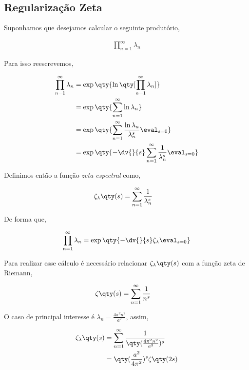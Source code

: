 \documentclass[twoside]{amsart}
\numberwithin{equation}{section}
\begin{document}
\appendix

\begin{refsection}
\section{Regularização Zeta}

Suponhamos que desejamos calcular o seguinte produtório,

\begin{align}
    \prod\limits_{n=1}^{\infty}\lambda_n
\end{align}

Para isso reescrevemos,

\begin{align}
    \prod\limits_{n=1}^{\infty}\lambda_n&=\exp\qty{\ln\qty[\prod\limits_{n=1}^{\infty}\lambda_n]}\\
    &=\exp\qty{\sum\limits_{n=1}^{\infty}\ln\lambda_n}\\
    &=\exp\qty{\sum\limits_{n=1}^{\infty}\frac{\ln\lambda_n}{\lambda_n^s}\eval_{s=0}}\\
    &=\exp\qty{-\dv{}{s}\sum\limits_{n=1}^{\infty}\frac{1}{\lambda_n^s}\eval_{s=0}}
\end{align}

Definimos então a função \emph{zeta espectral} como,

\begin{align}
    \zeta_\lambda\qty(s)&=\sum\limits_{n=1}^{\infty}\frac{1}{\lambda_n^s}
\end{align}

De forma que,

\begin{align}
    \prod\limits_{n=1}^{\infty}\lambda_n=\exp\qty{-\dv{}{s}\zeta_\lambda\eval_{s=0}}
\end{align}

Para realizar esse cálculo é necessário relacionar $\zeta_\lambda\qty(s)$ com a função zeta de Riemann,

\begin{align}
    \zeta\qty(s)&=\sum\limits_{n=1}^\infty\frac{1}{n^s}
\end{align}

O caso de principal interesse é $\lambda_n=\frac{4\pi^2n^2}{a^2}$, assim,

\begin{align}
    \zeta_{\lambda}\qty(s)&=\sum\limits_{n=1}^{\infty}\frac{1}{\qty(\frac{4\pi^2n^2}{a^2})^s}\\
    &=\qty(\frac{a^2}{4\pi^2})^s\zeta\qty(2s)
\end{align}


\end{refsection}
\end{document}

